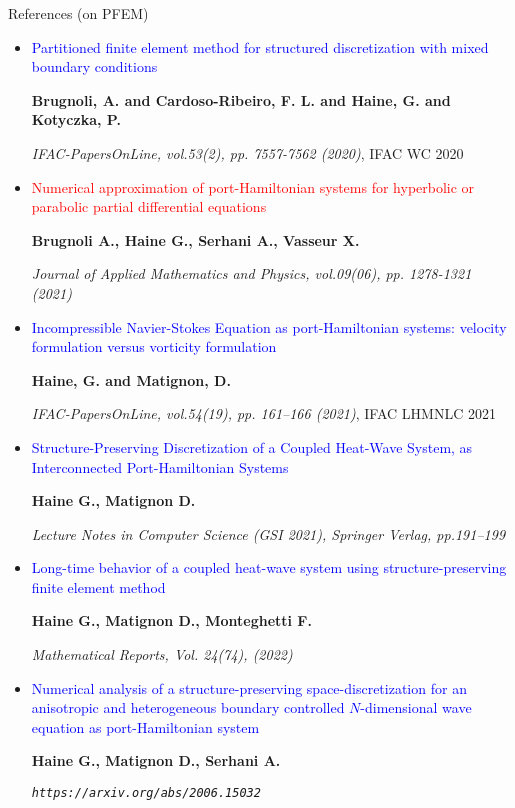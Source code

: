 \documentclass[10pt,aspectratio=43]{ISAE-Beamer}
\newcommand{\blue}[1]{\textcolor{blue}{#1}}
\newcommand{\red}[1]{\textcolor{red}{#1}}
\newcommand{\biblio}{\blue{\tiny\faBook}}
\begin{document}
\begin{frame}{References (on PFEM)}

{\tiny\vspace*{-0.15cm}
  \begin{itemize}

  \item[\biblio] \blue{Partitioned finite element method for structured discretization with mixed boundary conditions}

\textbf{Brugnoli, A. and Cardoso-Ribeiro, F. L. and Haine, G. and Kotyczka, P. }

\textit{IFAC-PapersOnLine, vol.53(2), pp. 7557-7562 (2020)}, IFAC WC 2020
    

\item[\biblio] \red{Numerical approximation of port-Hamiltonian systems for
hyperbolic or parabolic partial differential equations}

\textbf{Brugnoli A., Haine G., Serhani A., Vasseur X.}

\textit{Journal of Applied Mathematics and Physics, vol.09(06), pp. 1278-1321 (2021)}


 \item[\biblio] \blue{Incompressible Navier-Stokes Equation as port-Hamiltonian systems: velocity formulation versus vorticity formulation }

\textbf{Haine, G. and Matignon, D. }

\textit{IFAC-PapersOnLine, vol.54(19), pp. 161–166 (2021)}, IFAC LHMNLC 2021
    

\item[\biblio] \blue{Structure-Preserving Discretization of a Coupled Heat-Wave System, as Interconnected Port-Hamiltonian Systems}

\textbf{Haine G., Matignon D.}

\textit{Lecture Notes in Computer Science (GSI 2021), Springer Verlag, pp.191--199}

\item[\biblio] \blue{Long-time behavior of a coupled heat-wave system using structure-preserving finite element method}

\textbf{Haine G., Matignon D., Monteghetti F.}


\textit{Mathematical Reports, Vol. 24(74), (2022)}
    
\item[\biblio] \blue{Numerical analysis of a structure-preserving space-discretization for an anisotropic and heterogeneous boundary controlled $N$-dimensional wave equation as port-Hamiltonian system}

\textbf{Haine G., Matignon D., Serhani A.}

\textit{{\tt https://arxiv.org/abs/2006.15032}}


\end{itemize}}
\end{frame}


\end{document}
